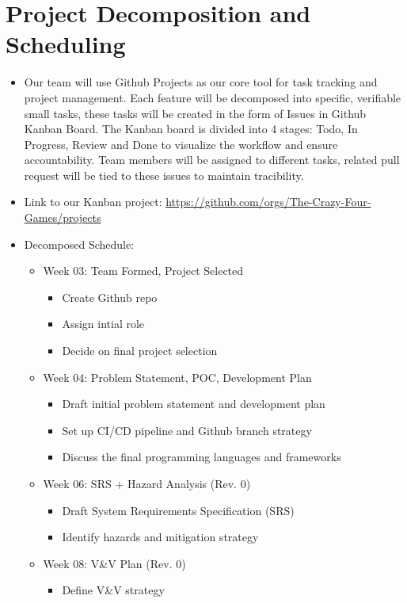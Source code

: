 \documentclass{article}
\begin{document}
\section{Project Decomposition and Scheduling}

\begin{itemize}
  \item Our team will use Github Projects as our core tool for task tracking and project management. Each feature will be decomposed into specific, verifiable small tasks, these tasks will be created in the form of Issues in Github Kanban Board. The Kanban board is divided into 4 stages: Todo, In Progress, Review and Done to visualize the workflow and ensure accountability. Team members will be assigned to different tasks, related pull request will be tied to these issues to maintain tracibility.
  \item Link to our Kanban project: \url{https://github.com/orgs/The-Crazy-Four-Games/projects}
  \item Decomposed Schedule:
	\begin{itemize}
		\item Week 03: Team Formed, Project Selected
			\begin{itemize}
			\item Create Github repo
			\item Assign intial role
			\item Decide on final project selection
			\end{itemize}		
		\item Week 04: Problem Statement, POC, Development Plan
			\begin{itemize}
			\item Draft initial problem statement and development plan
			\item Set up CI/CD pipeline and Github branch strategy
			\item Discuss the final programming languages and frameworks
			\end{itemize}
		\item Week 06: SRS + Hazard Analysis (Rev. 0)
			\begin{itemize}
			\item Draft System Requirements Specification (SRS)
			\item Identify hazards and mitigation strategy
			\end{itemize}
		\item Week 08: V\&V Plan (Rev. 0)
			\begin{itemize}
			\item Define V\&V strategy

\end{itemize}
\end{itemize}
\end{itemize}
\end{document}
